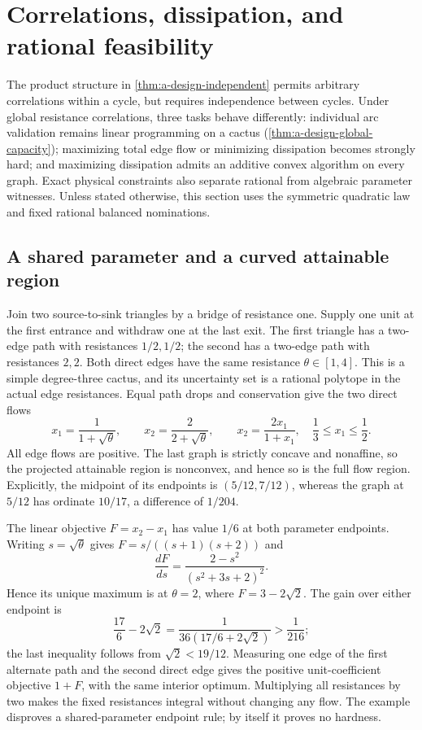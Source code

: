 \section{Correlations, dissipation, and rational feasibility}
\label{sec:a-corr-energy}

The product structure in \cref{thm:a-design-independent} permits arbitrary
correlations within a cycle, but requires independence between cycles.
Under global resistance correlations, three tasks behave differently:
individual arc validation remains linear programming on a cactus
(\cref{thm:a-design-global-capacity}); maximizing total edge flow or
minimizing dissipation becomes strongly hard; and maximizing dissipation
admits an additive convex algorithm on every graph. Exact physical
constraints also separate rational from algebraic parameter witnesses.
Unless stated otherwise, this section uses the symmetric quadratic law
and fixed rational balanced nominations.

\subsection{A shared parameter and a curved attainable region}

\begin{example}
\label{ex:a-corr-shared}
Join two source-to-sink triangles by a bridge of resistance one. Supply one
unit at the first entrance and withdraw one at the last exit. The first
triangle has a two-edge path with resistances $1/2,1/2$; the second has a
two-edge path with resistances $2,2$. Both direct edges have the same
resistance $\theta\in[1,4]$. This is a simple degree-three cactus, and its
uncertainty set is a rational polytope in the actual edge resistances.
Equal path drops and conservation give the two direct flows
\[
 x_1=\frac1{1+\sqrt\theta},\qquad
 x_2=\frac2{2+\sqrt\theta},\qquad
 x_2=\frac{2x_1}{1+x_1},\quad \frac13\le x_1\le\frac12.
\]
All edge flows are positive. The last graph is strictly concave and
nonaffine, so the projected attainable region is nonconvex, and hence
so is the full flow region. Explicitly, the midpoint of its endpoints is
$(5/12,7/12)$, whereas the graph at $5/12$ has ordinate $10/17$, a
difference of $1/204$.

The linear objective $F=x_2-x_1$ has value $1/6$ at both parameter
endpoints. Writing $s=\sqrt\theta$ gives
$F=s/((s+1)(s+2))$ and
\[
 \frac{dF}{ds}=\frac{2-s^2}{(s^2+3s+2)^2}.
\]
Hence its unique maximum is at $\theta=2$, where
$F=3-2\sqrt2$. The gain over either endpoint is
\[
 \frac{17}{6}-2\sqrt2
 =\frac{1}{36(17/6+2\sqrt2)}>\frac1{216};
\]
the last inequality follows from $\sqrt2<19/12$. Measuring one edge of
the first alternate path and the second direct edge gives the positive
unit-coefficient objective $1+F$, with the same interior optimum.
Multiplying all resistances by two makes the fixed resistances integral
without changing any flow. The example disproves a shared-parameter
endpoint rule; by itself it proves no hardness.
\end{example}

